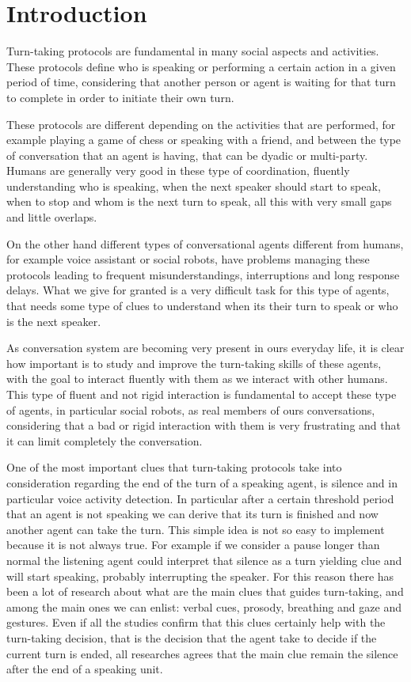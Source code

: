 \documentclass[../main.tex]{subfiles}
\begin{document}
\section{Introduction}
Turn-taking protocols are fundamental in many social aspects and activities. These protocols define who is speaking or performing a certain action in a given period of time, considering that another person or agent is waiting for that turn to complete in order to initiate their own turn. 

These protocols are different depending on the activities that are performed, for example playing a game of chess or speaking with a friend, and between the type of conversation that an agent is having, that can be dyadic or multi-party. Humans are generally very good in these type of coordination, fluently understanding who is speaking, when the next speaker should start to speak, when to stop and whom is the next turn to speak, all this with very small gaps and little overlaps. 

On the other hand different types of conversational agents different from humans, for example voice assistant or social robots, have problems managing these protocols leading to frequent misunderstandings, interruptions and long response delays. What we give for granted is a very difficult task for this type of agents, that needs some type of clues to understand when its their turn to speak or who is the next speaker. 

As conversation system are becoming very present in ours everyday life, it is clear how important is to study and improve the turn-taking skills of these agents, with the goal to interact fluently with them as we interact with other humans. This type of fluent and not rigid interaction is fundamental to accept these type of agents, in particular social robots, as real members of ours conversations, considering that a bad or rigid interaction with them is very frustrating and that it can limit completely the conversation. 

One of the most important clues that turn-taking protocols take into consideration regarding the end of the turn of a speaking agent, is silence and in particular voice activity detection. In particular after a certain threshold period that an agent is not speaking we can derive that its turn is finished and now another agent can take the turn. This simple idea is not so easy to implement because it is not always true. For example if we consider a pause longer than normal the listening agent could interpret that silence as a turn yielding clue and will start speaking, probably interrupting the speaker. For this reason there has been a lot of research about what are the main clues that guides turn-taking, and among the main ones we can enlist: verbal cues, prosody, breathing and gaze and gestures. Even if all the studies confirm that this clues certainly help with the turn-taking decision, that is the decision that the agent take to decide if the current turn is ended, all researches agrees that the main clue remain the silence after the end of a speaking unit.
\end{document}
